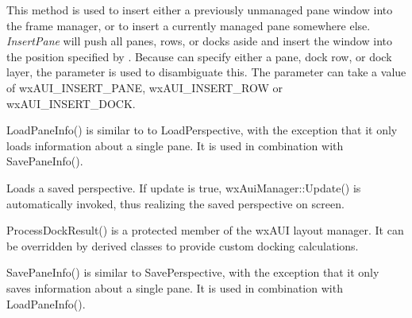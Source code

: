 
This method is used to insert either a previously unmanaged pane window
into the frame manager, or to insert a currently managed pane somewhere 
else. {\it InsertPane} will push all panes, rows, or docks aside and
insert the window into the position specified by . 
Because  can specify either a pane, dock row, or dock
layer, the  parameter is used to disambiguate this. The
parameter  can take a value of wxAUI\_INSERT\_PANE, wxAUI\_INSERT\_ROW 
or wxAUI\_INSERT\_DOCK.

\label{wxauimanagerloadpaneinfo}


LoadPaneInfo() is similar to to LoadPerspective, with the exception that it only loads information about a single pane.  It is used in combination with SavePaneInfo().

\label{wxauimanagerloadperspective}


Loads a saved perspective. If update is true, wxAuiManager::Update()
is automatically invoked, thus realizing the saved perspective on screen.

\label{wxauimanagerprocessdockresult}


ProcessDockResult() is a protected member of the wxAUI layout manager.  It can be overridden by derived classes to provide custom docking calculations.

\label{wxauimanagersavepaneinfo}


SavePaneInfo() is similar to SavePerspective, with the exception that it only saves information about a single pane.  It is used in combination with LoadPaneInfo().

\label{wxauimanagersaveperspective}

